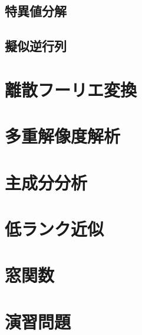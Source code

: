 \documentclass[../../main]{subfiles}
\begin{document}
\subsection{特異値分解}
\subsection{擬似逆行列}

\section{離散フーリエ変換}

\section{多重解像度解析}

\begin{subappendices}
\section{主成分分析}
\section{低ランク近似}
\section{窓関数}
\end{subappendices}

\section*{演習問題}
\end{document}
